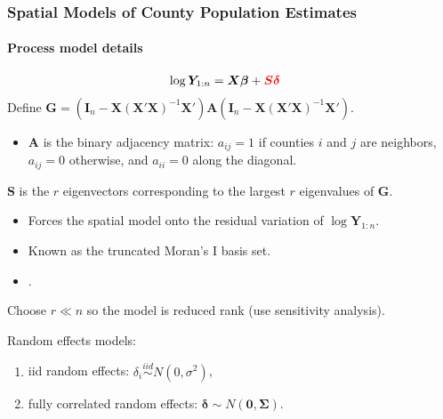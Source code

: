 \documentclass[xcolor=dvipsnames]{beamer}
\begin{document}
\begin{frame}
\frametitle{Spatial Models of County Population Estimates}
\framesubtitle{Process model details}
\vspace{-0.6cm}
\begin{align*}
\log\bm{Y}_{1:n} &= \bm{X}\bm{\beta} + {\color{red}\bm{S}\bm{\delta}}
\end{align*}
Define $\bm{G}=(\bm{I}_n - \bm{X}(\bm{X}'\bm{X})^{-1}\bm{X}')\bm{A}(\bm{I}_n - \bm{X}(\bm{X}'\bm{X})^{-1}\bm{X}')$.\\
\begin{itemize}
\item[] $\bm{A}$ is the binary adjacency matrix: $a_{ij} = 1$ if counties $i$ and $j$ are neighbors, $a_{ij}=0$ otherwise, and $a_{ii}=0$ along the diagonal.\vspace{0.3cm}
\end{itemize}
$\bm{S}$ is the $r$ eigenvectors corresponding to the largest $r$ eigenvalues of $\bm{G}$.
\begin{itemize}
\item Forces the spatial model onto the residual variation of $\log \bm{Y}_{1:n}$.
\item Known as the truncated Moran's I basis set.
\item\citet{hughes2013dimension,porter2015bayesian,bradley2015multivariate}.\vspace{0.3cm}
\end{itemize}

Choose $r\ll n$ so the model is reduced rank (use sensitivity analysis). \vspace{0.3cm}

 Random effects models:
\begin{enumerate}
\item iid random effects: $\delta_i\stackrel{iid}{\sim}N(0,\sigma^2)$,
\item fully correlated random effects: $\bm{\delta}\sim N(\bm{0},\bm{\Sigma})$.
\end{enumerate}
\end{frame}
\end{document}
